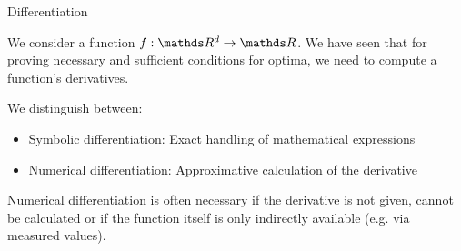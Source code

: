 












\begin{vbframe}{Differentiation}

  We consider a function $f: \R^d \rightarrow \R$. We have seen that for proving necessary and sufficient conditions for optima, we need to compute a function's derivatives. 
  
  \lz 
  
  We distinguish between: 
  
  \begin{itemize}
  \item Symbolic differentiation: Exact handling of mathematical expressions
  \item Numerical differentiation: Approximative calculation of the derivative
  \end{itemize}
  
  Numerical differentiation is often necessary if the derivative is not given, cannot be calculated or if the function itself is only indirectly available (e.g. via measured values).
  
  \end{vbframe}
  
